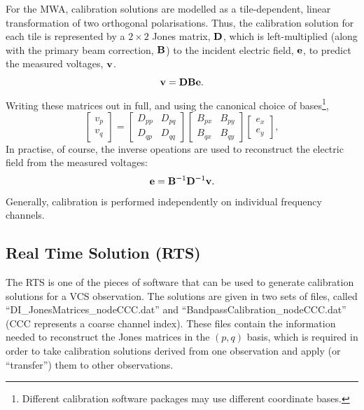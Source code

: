 \documentclass{book}
\begin{document}
For the MWA, calibration solutions are modelled as a tile-dependent, linear transformation of two orthogonal polarisations.
Thus, the calibration solution for each tile is represented by a $2\times2$ Jones matrix, ${\bf D}$, which is left-multiplied (along with the primary beam correction, ${\bf B}$) to the incident electric field, ${\bf e}$, to predict the measured voltages, ${\bf v}$.
\begin{equation}
    {\bf v} = {\bf D}{\bf B}{\bf e}.
\end{equation}
Writing these matrices out in full, and using the canonical choice of bases\footnote{Different calibration software packages may use different coordinate bases.},
\begin{equation}
    \begin{bmatrix} v_p \\ v_q \end{bmatrix}
        = \begin{bmatrix}
            D_{pp} & D_{pq} \\
            D_{qp} & D_{qq}
        \end{bmatrix}
        \begin{bmatrix}
            B_{px} & B_{py} \\
            B_{qx} & B_{qy}
        \end{bmatrix}
        \begin{bmatrix} e_x \\ e_y \end{bmatrix},
\end{equation}
In practise, of course, the inverse opeations are used to reconstruct the electric field from the measured voltages:
\begin{equation}
    {\bf e} = {\bf B}^{-1}{\bf D}^{-1}{\bf v}.
\end{equation}
Generally, calibration is performed independently on individual frequency channels.

\subsection{Real Time Solution (RTS)}

The RTS is one of the pieces of software that can be used to generate calibration solutions for a VCS observation.
The solutions are given in two sets of files, called ``DI\_JonesMatrices\_nodeCCC.dat'' and ``BandpassCalibration\_nodeCCC.dat'' (CCC represents a coarse channel index).
These files contain the information needed to reconstruct the Jones matrices in the $(p,q)$ basis, which is required in order to take calibration solutions derived from one observation and apply (or ``transfer'') them to other observations.
\end{document}
